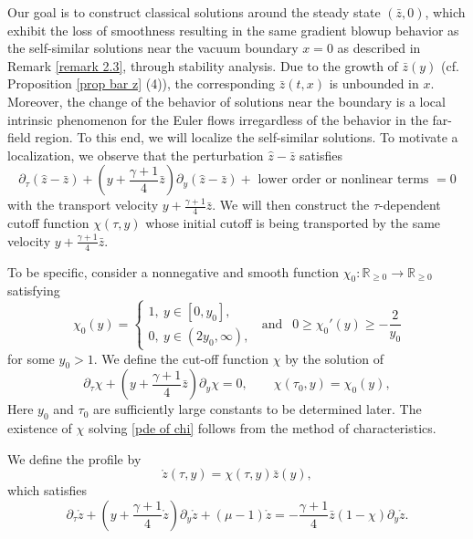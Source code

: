 \documentclass{article}
\newcommand{\R}{\mathbb{R}}
\newcommand{\ga}{\gamma}
\newcommand{\pa}{\partial}
\def\be{\begin{equation}}
\def\ee{\end{equation}}
\numberwithin{equation}{section}
\begin{document}
Our goal is to construct classical solutions around the steady state $(\bar z, 0)$, which exhibit the loss of smoothness resulting in the same gradient blowup behavior as the self-similar solutions near the vacuum boundary $x=0$ as described in Remark \ref{remark 2.3}, through stability analysis. Due to the growth of $\bar z (y)$ (cf. Proposition \ref{prop bar z} (4)), the corresponding $\bar z (t,x)$ is unbounded in $x$. Moreover, the change of the behavior of solutions near the boundary is a local intrinsic phenomenon for the Euler flows irregardless of the behavior in the far-field region. To this end, we will localize the self-similar solutions. To motivate a localization, 
we observe that the perturbation $\hat z -\bar z$ satisfies 
\[
\partial_\tau \left( \hat z -\bar z\right) + (y+\frac{\ga+1}{4}\bar z ) \partial_y ( \hat z -\bar z) +  \text{ lower order or  nonlinear terms } =0
\]
with the transport velocity $y+\frac{\ga+1}{4}\bar z $. We will then construct the $\tau$-dependent cutoff function $\chi (\tau, y)$ whose initial cutoff is being transported by the same velocity $y+\frac{\ga+1}{4}\bar z$. 



To be specific, consider a  nonnegative and smooth function $\chi_0:\R_{\geq 0}\to\R_{\geq 0}$ satisfying 
\be\label{def chi}
	\chi_0(y)=\begin{cases}
		 1,\ y\in[0, y_0],\\
		 0,\ y\in(2y_0,\infty),
	\end{cases} \ \text{ and }\ \ 0\geq \chi_0'(y) \geq -\frac{2}{y_0} 
\ee
for some $y_0>1$. 
We define the cut-off function $\chi$ by the solution of  %
\be\label{pde of chi}
	\pa_\tau \chi+(y+\frac{\ga+1}{4}\bar z )\pa_y \chi =0,\qquad \chi(\tau_0,y) = \chi_0(y), 
\ee
Here $y_0$ and $\tau_0$ are sufficiently large constants to be determined later. The existence of $\chi$ solving \eqref{pde of chi} follows from the method of characteristics.   

We define the %
profile by 
\be\label{def mathring z}
	\mathring z(\tau,y) = \chi(\tau ,y) \bar z(y),  
\ee
which satisfies 
\be\label{pde of mathring z}
	\pa_\tau \mathring z+(y+\frac{\ga+1}{4}\mathring z )\pa_y \mathring z+(\mu-1)\mathring z = -\frac{\ga+1}{4} \bar z (1-\chi) \pa_y \mathring z.
\ee	
\end{document}
